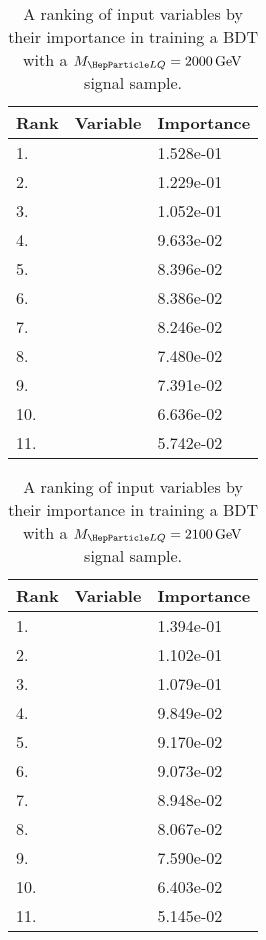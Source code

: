 \begin{table}[H]
	\caption{A ranking of input variables by their importance in training a BDT with a $\MLQ = \SI{2000}{GeV}$ signal sample.}
	\begin{center}
		\begin{tabular}{lll} \hline \hline
			Rank & Variable & Importance  \\ \hline
			1. & \MujTwo & 1.528e-01 \\
			2. & \Muujj & 1.229e-01 \\
			3. & \MujOne & 1.052e-01 \\
			4. & \ST & 9.633e-02 \\
			5. & \ptof{\PmuTwo} & 8.396e-02 \\
			6. & \Muu & 8.386e-02 \\
			7. & \ptof{\PmuOne} & 8.246e-02 \\
			8. & \ptof{\PjTwo} & 7.480e-02 \\
			9. & \ptof{\PjOne} & 7.391e-02 \\
			10. & \DRof{\PmuOne+\PmuTwo}{\PjOne} & 6.636e-02 \\
			11. & \MET & 5.742e-02 \\ \hline \hline
		\end{tabular}
		\label{tab:bdtRank2000}
	\end{center}
\end{table}

\begin{table}[H]
	\caption{A ranking of input variables by their importance in training a BDT with a $\MLQ = \SI{2100}{GeV}$ signal sample.}
	\begin{center}
		\begin{tabular}{lll} \hline \hline
			Rank & Variable & Importance  \\ \hline
			1. & \MujTwo & 1.394e-01 \\
			2. & \Muujj & 1.102e-01 \\
			3. & \MujOne & 1.079e-01 \\
			4. & \ST & 9.849e-02 \\
			5. & \ptof{\PjTwo} & 9.170e-02 \\
			6. & \ptof{\PmuTwo} & 9.073e-02 \\
			7. & \Muu & 8.948e-02 \\
			8. & \DRof{\PmuOne+\PmuTwo}{\PjOne} & 8.067e-02 \\
			9. & \ptof{\PmuOne} & 7.590e-02 \\
			10. & \ptof{\PjOne} & 6.403e-02 \\
			11. & \MET & 5.145e-02 \\ \hline \hline
		\end{tabular}
		\label{tab:bdtRank2100}
	\end{center}
\end{table}

